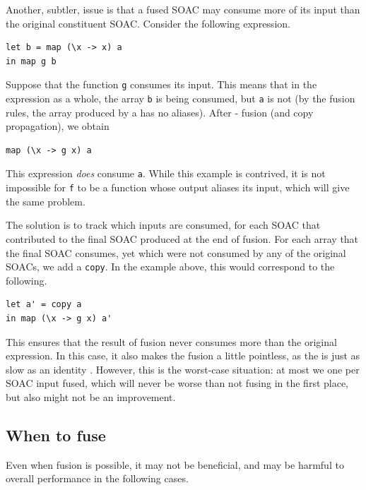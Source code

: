 Another, subtler, issue is that a fused SOAC may consume more of its
input than the original constituent SOAC.  Consider the following
expression.
\begin{lstlisting}
let b = map (\x -> x) a
in map g b
\end{lstlisting}
Suppose that the function \texttt{g} consumes its input.  This means
that in the expression as a whole, the array \texttt{b} is being
consumed, but \texttt{a} is not (by the fusion rules, the array
produced by a  has no aliases).  After -
fusion (and copy propagation), we obtain
\begin{lstlisting}
map (\x -> g x) a
\end{lstlisting}
This expression \textit{does} consume \texttt{a}.  While this example
is contrived, it is not impossible for \texttt{f} to be a function
whose output aliases its input, which will give the same problem.

The solution is to track which inputs are consumed, for each SOAC that
contributed to the final SOAC produced at the end of fusion.  For each
array that the final SOAC consumes, yet which were not consumed by any
of the original SOACs, we add a \texttt{copy}.  In the example above,
this would correspond to the following.
\begin{lstlisting}
let a' = copy a
in map (\x -> g x) a'
\end{lstlisting}%
This ensures that the result of fusion never consumes more than the
original expression.  In this case, it also makes the fusion a little
pointless, as the  is just as slow as an identity .
However, this is the worst-case situation: at most we one 
per SOAC input fused, which will never be worse than not fusing in the
first place, but also might not be an improvement.

\subsection{When to fuse}
\label{sec:whentofuse}

Even when fusion is possible, it may not be beneficial, and may be
harmful to overall performance in the following cases.

